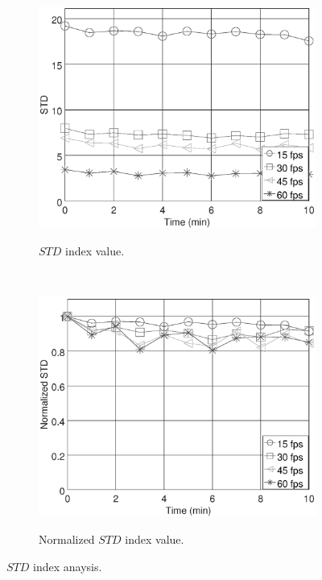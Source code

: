 \documentclass[review]{elsarticle}
\begin{document}
\begin{figure}[ht!]
    \centering
    \begin{subfigure}{0.48\textwidth}
        \caption{$STD$ index value.}
        \includegraphics[width=\textwidth]{FPS_f11_rawSTD.eps}
        \label{fig:stdraw}
    \end{subfigure}
    ~ %
    \begin{subfigure}{0.48\textwidth}
        \caption{Normalized $STD$ index value.}
        \includegraphics[width=\textwidth]{FPS_f11_norm1STD.eps}
        \label{fig:stdnorm}
    \end{subfigure}
    \caption{$STD$ index anaysis.}\label{fig:STDtest1}
\end{figure}
\end{document}
